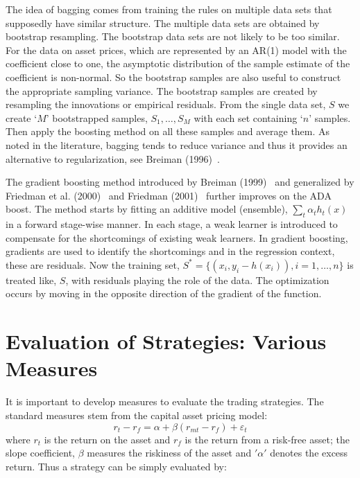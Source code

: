 The idea of bagging comes from training the rules on multiple data sets that supposedly have similar structure. The multiple data sets are obtained by bootstrap  resampling. The bootstrap data sets are not likely to be too similar. For the data on asset prices, which are represented by an AR(1) model with the coefficient close to one, the asymptotic distribution of the sample estimate of the coefficient is non-normal. So the bootstrap samples are also useful to construct the appropriate sampling variance. The bootstrap samples are created by resampling the innovations or empirical residuals. From the single data set, $S$ we create `$M$' bootstrapped samples, $S_1,\ldots, S_M$ with each set containing `$n$' samples. Then apply the boosting method on all these samples and average them. As noted in the literature, bagging tends to reduce variance and thus it provides an alternative to regularization, see Breiman (1996)~\cite{breiman1996bagging}.


The gradient boosting method introduced by Breiman (1999)~\cite{breiman1999prediction} and generalized by Friedman et al. (2000)~\cite{friedman2000additive} and Friedman (2001)~\cite{friedman2001greedy} further improves on the ADA boost. The method starts by fitting an additive model (ensemble), $\sum_t \alpha_t h_t (x)$ in a forward stage-wise manner. In each stage, a weak learner is introduced to compensate for the shortcomings of existing weak learners. In gradient boosting, gradients are used to identify the shortcomings and in the regression context, these are residuals. Now the training set, $S^*=\{(x_i, y_i-h(x_i)) , i =1,\ldots,n\}$ is treated like, $S$, with residuals playing the role of the data. The optimization occurs by moving in the opposite direction of the gradient of the function.


\section{Evaluation of Strategies: Various Measures}


It is important to develop measures to evaluate the trading strategies. The standard measures stem from the capital asset pricing model:
	\begin{equation}
	r_{t} - r_f = \alpha + \beta (r_{mt} - r_f) + \varepsilon_{t} 
	\end{equation}
where $r_t$ is the return on the asset and $r_f$ is the return from a risk-free asset; the slope coefficient, $\beta$ measures the riskiness of the asset and $'\alpha'$ denotes the excess return. Thus a strategy can be simply evaluated by: \\


